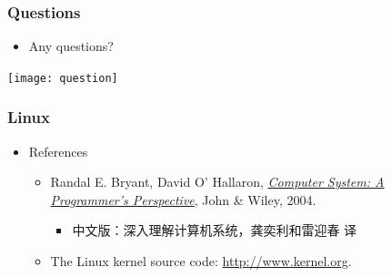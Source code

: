 \documentclass[CJKutf8,dvipsnames,table]{beamer}
\begin{document}
\begin{CJK*}{UTF8}{song}
\begin{frame}[fragile]
\fi

\end{frame}
  

  
  \begin{frame}
    \frametitle{Questions}
    \begin{itemize}
    \item{Any questions?}
    \end{itemize}
    \begin{center}
      \texttt{[image: question]}
    \end{center}
  \end{frame}
  
  \begin{frame}
    \frametitle{Linux} \pause
    \begin{itemize}
    \item{References} \pause
      \begin{itemize}
      \item{Randal E. Bryant, David O' Hallaron, \href{http://csapp.cs.cmu.edu/}{\emph{Computer System: A Programmer's Perspective}}, John \& Wiley, 2004.} \pause
        \begin{itemize}
        \item{中文版：深入理解计算机系统，龚奕利和雷迎春 译} \pause
        \end{itemize}
      \item{The Linux kernel source code: \url{http://www.kernel.org}.}
      \end{itemize}
    \end{itemize}
  \end{frame}


\end{CJK*}
\end{document}
